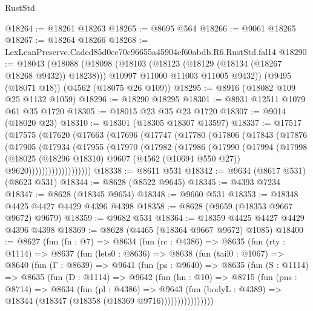 \begin{lexlean}{RustStd}
\begin{coremodule}
@18264 := @18261 @18263
@18265 := @8695 @564
@18266 := @9061 @18265
@18267 := @18264 @18266
@18268 := LexLeanPreserve.Caded85d0ec70c96655a45904ef60abdb.R6.RustStd.fal14
@18290 := @18043
    (@18088
      (@18098
        (@18103 (@18123 (@18129 (@18134 (@18267 @18268 @9432)) @18238)))
        @10997
        @11000
        @11003
        @11005
        @9432))
    (@9495 (@18071 @18))
    (@4562 (@18075 @26 @109))
@18295 := @8916 (@18082 @109 @25 @1132 @1059)
@18296 := @18290 @18295
@18301 := @8931 @12511 @1079 @61 @35 @1720
@18305 := @18015 @23 @35 @23 @1720
@18307 := @9014 (@18020 @23)
@18310 := @18301 (@18305 @18307 @13597)
@18337 := @17517
    (@17575
      (@17620
        (@17663
          (@17696
            (@17747
              (@17780
                (@17806
                  (@17843
                    (@17876
                      (@17905
                        (@17934
                          (@17955
                            (@17970
                              (@17982
                                (@17986
                                  (@17990
                                    (@17994
                                      (@17998
                                        (@18025
                                          (@18296 @18310)
                                          @9607
                                          (@4562 (@10694 @550 @27))
                                          @9620)))))))))))))))))))
@18338 := @8611 @531
@18342 := @9634 (@8617 @531) (@8623 @531)
@18344 := @8628 (@8522 @9645)
@18345 := @4393 @7234
@18347 := @8628 (@18345 @9654)
@18348 := @9660 @531
@18353 := @18348 @4425 @4427 @4429 @4396 @4398
@18358 := @8628 (@9659 (@18353 @9667 @9672) @9679)
@18359 := @9682 @531
@18364 := @18359 @4425 @4427 @4429 @4396 @4398
@18369 := @8628 (@4465 (@18364 @9667 @9672) @1085)
@18400 := @8627
    (fun (fn : @7) =>
    @8634
      (fun (rc : @4386) =>
      @8635
        (fun (rty : @1114) =>
        @8637
          (fun (lets0 : @8636) =>
          @8638
            (fun (tail0 : @1067) =>
            @8640
              (fun (Γ : @8639) =>
              @9641
                (fun (ps : @9640) =>
                @8635
                  (fun (S : @1114) =>
                  @8635
                    (fun (D : @1114) =>
                    @9642
                      (fun (hn : @10) =>
                      @8715
                        (fun (pns : @8714) =>
                        @8634
                          (fun (pl : @4386) =>
                          @9643
                            (fun (bodyL : @4389) =>
                            @18344 (@18347 (@18358 (@18369 @9716))))))))))))))))

\end{coremodule}
\end{lexlean}

